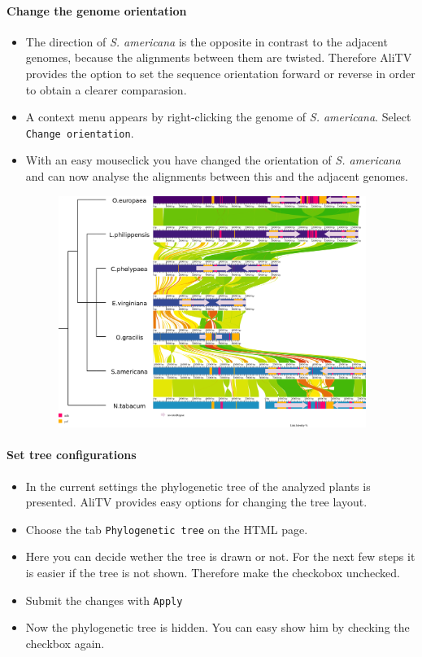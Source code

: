 \documentclass[a4paper]{scrartcl}
\begin{document}
\paragraph*{Change the genome orientation}
\begin{itemize}
	\item The direction of \emph{S. americana} is the opposite in contrast to the adjacent genomes, because the alignments between them are twisted. Therefore AliTV provides the option to set the sequence orientation forward or reverse in order to obtain a clearer comparasion. 
	\item A context menu appears by right-clicking the genome of \emph{S. americana}. Select \texttt{Change orientation}.
	\item With an easy mouseclick you have changed the orientation of \emph{S. americana} and can now analyse the alignments between this and the adjacent genomes.
	
	\begin{figure}[H]
		\centering
		\includegraphics[width=10cm]{reverse.png}
	\end{figure}
	
\end{itemize}
	
\paragraph*{Set tree configurations}
\begin{itemize}
	\item In the current settings the phylogenetic tree of the analyzed plants is presented. AliTV provides easy options for changing the tree layout.
	\item Choose the tab \texttt{Phylogenetic tree} on the HTML page.
	\item Here you can decide wether the tree is drawn or not. For the next few steps it is easier if the tree is not shown. Therefore make the checkobox unchecked.
	\item Submit the changes with \texttt{Apply}
	\item Now the phylogenetic tree is hidden. You can easy show him by checking the checkbox again.
\end{itemize}
\end{document}
